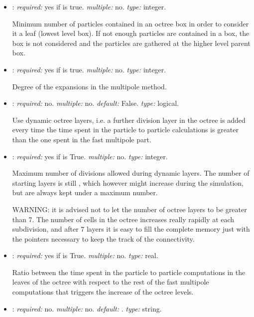 \begin{itemize}
\item {}: \textit{required:} yes if  is true. 
\textit{multiple:} no. \textit{type:} integer.

Minimum number of particles contained in an octree box in order to consider 
it a leaf (lowest level box). If not enough particles are contained in a 
box, the box is not considered and the particles are gathered at the higher 
level parent box.

\item {}: \textit{required:} yes if  is true. 
\textit{multiple:} no. \textit{type:} integer.

Degree of the expansions in the multipole method. 

\item {}: \textit{required:} no. \textit{multiple:} no. 
\textit{default:} False. \textit{type:} logical.

Use dynamic octree layers, i.e. a further division layer in the octree 
is added every time the time spent in the particle to particle calculations 
is greater than the one spent in the fast multipole part.

\item {}: \textit{required:} yes if  is True. 
\textit{multiple:} no. \textit{type:} integer.

Maximum number of divisions allowed during dynamic layers. The number of starting 
layers is still , which however might increase during the 
simulation, but are always kept under a maximum number. 

WARNING: it is advised not to let the number of octree layers to be greater than 7. 
The number of cells in the octree increases really rapidly at each subdivision, 
and after 7 layers it is easy to fill the complete memory just with the pointers 
necessary to keep the track of the connectivity. 

\item {}: \textit{required:} yes if  is True. 
\textit{multiple:} no. \textit{type:} real.

Ratio between the time spent in the particle to particle computations in the 
leaves of the octree with respect to the rest of the fast multipole computations 
that triggers the increase of the octree levels.

\item {}: \textit{required:} no. \textit{multiple:} no. 
\textit{default:} . \textit{type:} string.


\end{itemize}
